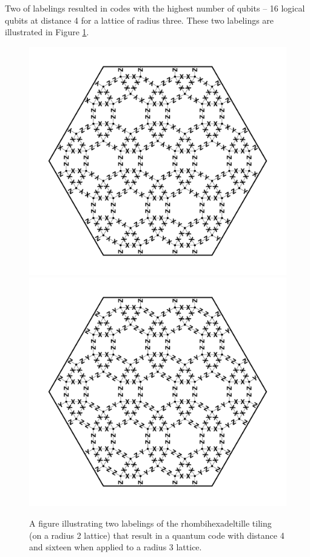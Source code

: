 \documentclass[12pt]{amsbook}
\theoremstyle{plain}
\theoremstyle{definition}
\theoremstyle{remark}
\begin{document}
Two of labelings resulted in codes with the highest number of qubits -- 16 logical qubits at distance 4 for a lattice of radius three.  These two labelings are illustrated in Figure \ref{figure:rhombihexadeltille-code-4-labelings}.



\begin{figure}
\includegraphics[width=4.75in]{images/rhombihexadeltille-code-4-labeling-1} %
\\
\includegraphics[width=4.75in]{images/rhombihexadeltille-code-4-labeling-2} %
\caption{
\label{figure:rhombihexadeltille-code-4-labelings}
A figure illustrating two labelings of the rhombihexadeltille tiling (on a radius 2 lattice) that result in a quantum code with distance 4 and sixteen when applied to a radius 3 lattice.
}
\end{figure}
\end{document}
